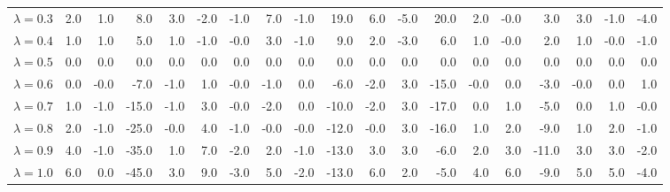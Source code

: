 \begin{table}[H]
{{\begin{tabular}{lrrrrrrrrrrrrrrrrrr}
\rule{0pt}{4ex}$\lambda=0.3$ & 2.0 & 1.0 & 8.0 & 3.0 & -2.0 & -1.0 & 7.0 & -1.0 & 19.0 & 6.0 & -5.0 & 20.0 & 2.0 & -0.0 & 3.0 & 3.0 & -1.0 & -4.0\\
$\lambda=0.4$ & 1.0 & 1.0 & 5.0 & 1.0 & -1.0 & -0.0 & 3.0 & -1.0 & 9.0 & 2.0 & -3.0 & 6.0 & 1.0 & -0.0 & 2.0 & 1.0 & -0.0 & -1.0\\
$\lambda=0.5$ & 0.0 & 0.0 & 0.0 & 0.0 & 0.0 & 0.0 & 0.0 & 0.0 & 0.0 & 0.0 & 0.0 & 0.0 & 0.0 & 0.0 & 0.0 & 0.0 & 0.0 & 0.0\\
$\lambda=0.6$ & 0.0 & -0.0 & -7.0 & -1.0 & 1.0 & -0.0 & -1.0 & 0.0 & -6.0 & -2.0 & 3.0 & -15.0 & -0.0 & 0.0 & -3.0 & -0.0 & 0.0 & 1.0\\
$\lambda=0.7$ & 1.0 & -1.0 & -15.0 & -1.0 & 3.0 & -0.0 & -2.0 & 0.0 & -10.0 & -2.0 & 3.0 & -17.0 & 0.0 & 1.0 & -5.0 & 0.0 & 1.0 & -0.0\\

\rule{0pt}{4ex}$\lambda=0.8$ & 2.0 & -1.0 & -25.0 & -0.0 & 4.0 & -1.0 & -0.0 & -0.0 & -12.0 & -0.0 & 3.0 & -16.0 & 1.0 & 2.0 & -9.0 & 1.0 & 2.0 & -1.0\\
$\lambda=0.9$ & 4.0 & -1.0 & -35.0 & 1.0 & 7.0 & -2.0 & 2.0 & -1.0 & -13.0 & 3.0 & 3.0 & -6.0 & 2.0 & 3.0 & -11.0 & 3.0 & 3.0 & -2.0\\
$\lambda=1.0$ & 6.0 & 0.0 & -45.0 & 3.0 & 9.0 & -3.0 & 5.0 & -2.0 & -13.0 & 6.0 & 2.0 & -5.0 & 4.0 & 6.0 & -9.0 & 5.0 & 5.0 & -4.0\\
\bottomrule
\end{tabular}
} %

} %
\end{table}

